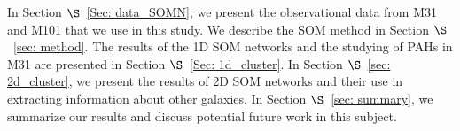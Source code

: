In Section $\S$~\ref{Sec: data_SOMN}, we present the observational data from M31 and M101 that we use in this study. 
We describe the SOM method in Section $\S$~\ref{sec: method}. 
The results of the 1D SOM networks and the studying of PAHs in M31 are presented in Section $\S$~\ref{Sec: 1d_cluster}.
In Section $\S$~\ref{sec: 2d_cluster}, we present the results of 2D SOM networks and their use in extracting information about other galaxies.
In Section $\S$~\ref{sec: summary}, we summarize our results and discuss potential future work in this subject.


















